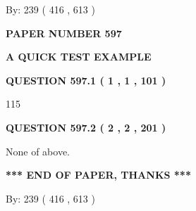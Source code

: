 \documentclass[12pt]{article}
\begin{document}
   
\hspace{1.0in} By: 
 239 ( 416 ,  613 )
   
   
   
   
\newpage 
\setcounter{page}{ 
   597001 } 
   
   
   
   
 {\textbf{ \Large{ PAPER NUMBER  597  }}}
   
   
\vspace{0.2in}
   
   
   
   
   
   
 \vspace{0.2in}
{\LARGE {\textbf{ A QUICK TEST EXAMPLE}}}
   
   
  
\vspace{0.2in}
  
{\textbf{\Large{QUESTION
597.1 
 ( 1 , 1 , 101 )
}}}
  
  
 
 
\noindent{}

115
 
 
  
\vspace{0.2in}
  
{\textbf{\Large{QUESTION
597.2 
 ( 2 , 2 , 201 )
}}}
  
  
 
 
\noindent{}
 
 
 None of above.
 
 
 
 
   
   
 \vspace{0.2in}
 
   
   
   
   
\vspace{1.0in} 
{\textbf{\large{ *** END OF PAPER, THANKS *** }}} 
   
   
\hspace{1.0in} By: 
 239 ( 416 ,  613 )
   
   
   
   
\newpage 
\setcounter{page}{ 
   598001 } 
   
   
   
\end{document}
